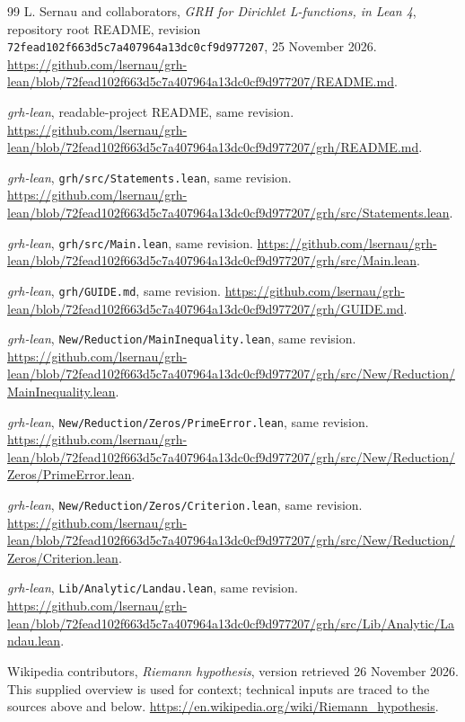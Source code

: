 \documentclass[11pt,a4paper]{article}
\theoremstyle{definition}
\theoremstyle{remark}
\numberwithin{equation}{section}
\begin{document}
\begin{thebibliography}{99}
\small
{}
L. Sernau and collaborators,
\emph{GRH for Dirichlet L-functions, in Lean 4}, repository root README,
revision \texttt{72fead102f663d5c7a407964a13dc0cf9d977207},
25 November 2026.
\url{https://github.com/lsernau/grh-lean/blob/72fead102f663d5c7a407964a13dc0cf9d977207/README.md}.

\emph{grh-lean}, readable-project README, same revision.
\url{https://github.com/lsernau/grh-lean/blob/72fead102f663d5c7a407964a13dc0cf9d977207/grh/README.md}.

\emph{grh-lean}, \texttt{grh/src/Statements.lean}, same revision.
\url{https://github.com/lsernau/grh-lean/blob/72fead102f663d5c7a407964a13dc0cf9d977207/grh/src/Statements.lean}.

\emph{grh-lean}, \texttt{grh/src/Main.lean}, same revision.
\url{https://github.com/lsernau/grh-lean/blob/72fead102f663d5c7a407964a13dc0cf9d977207/grh/src/Main.lean}.

\emph{grh-lean}, \texttt{grh/GUIDE.md}, same revision.
\url{https://github.com/lsernau/grh-lean/blob/72fead102f663d5c7a407964a13dc0cf9d977207/grh/GUIDE.md}.

\emph{grh-lean}, \texttt{New/Reduction/MainInequality.lean}, same revision.
\url{https://github.com/lsernau/grh-lean/blob/72fead102f663d5c7a407964a13dc0cf9d977207/grh/src/New/Reduction/MainInequality.lean}.

\emph{grh-lean}, \texttt{New/Reduction/Zeros/PrimeError.lean}, same revision.
\url{https://github.com/lsernau/grh-lean/blob/72fead102f663d5c7a407964a13dc0cf9d977207/grh/src/New/Reduction/Zeros/PrimeError.lean}.

\emph{grh-lean}, \texttt{New/Reduction/Zeros/Criterion.lean}, same revision.
\url{https://github.com/lsernau/grh-lean/blob/72fead102f663d5c7a407964a13dc0cf9d977207/grh/src/New/Reduction/Zeros/Criterion.lean}.

\emph{grh-lean}, \texttt{Lib/Analytic/Landau.lean}, same revision.
\url{https://github.com/lsernau/grh-lean/blob/72fead102f663d5c7a407964a13dc0cf9d977207/grh/src/Lib/Analytic/Landau.lean}.

Wikipedia contributors, \emph{Riemann hypothesis},
version retrieved 26 November 2026. This supplied overview is used
for context; technical inputs are traced to the sources above and below.
\url{https://en.wikipedia.org/wiki/Riemann_hypothesis}.


\end{thebibliography}
\end{document}

